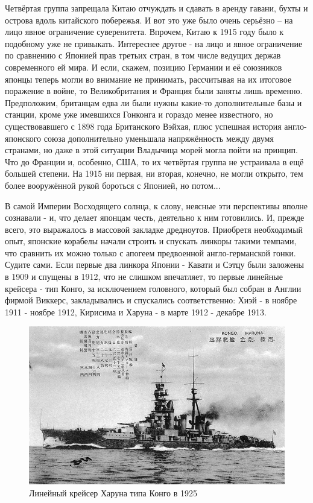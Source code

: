 Четвёртая группа запрещала Китаю отчуждать и сдавать в аренду гавани, бухты и острова вдоль китайского побережья. И вот это уже было очень серьёзно – на лицо явное ограничение суверенитета. Впрочем, Китаю к 1915 году было к подобному уже не привыкать. Интереснее другое - на лицо и явное ограничение по сравнению с Японией прав третьих стран, в том числе ведущих держав современного ей мира. И если, скажем, позицию Германии и её союзников японцы теперь могли во внимание не принимать, рассчитывая на их итоговое поражение в войне, то Великобритания и Франция были заняты лишь временно. Предположим, британцам едва ли были нужны какие-то дополнительные базы и станции, кроме уже имевшихся Гонконга и гораздо менее известного, но существовавшего с 1898 года Британского Вэйхая, плюс успешная история англо-японского союза дополнительно уменьшала напряжённость между двумя странами, но даже в этой ситуации Владычица морей могла пойти на принцип. Что до Франции и, особенно, США, то их четвёртая группа не устраивала в ещё большей степени. На 1915 ни первая, ни вторая, конечно, не могли открыто, тем более вооружённой рукой бороться с Японией, но потом...

В самой Империи Восходящего солнца, к слову, неясные эти перспективы вполне сознавали - и, что делает японцам честь, деятельно к ним готовились. И, прежде всего, это выражалось в массовой закладке дредноутов. Приобретя необходимый опыт, японские корабелы начали строить и спускать линкоры такими темпами, что сравнить их можно только с апогеем предвоенной англо-германской гонки. Судите сами. Если первые два линкора Японии - Кавати и Сэтцу были заложены в 1909 и спущены в 1912, что не слишком впечатляет, то первые линейные крейсера - тип Конго, за исключением головного, который был собран в Англии фирмой Виккерс, закладывались и спускались соответственно: Хиэй - в ноябре 1911 - ноябре 1912, Кирисима и Харуна - в марте 1912 - декабре 1913. 

\begin{figure}[h!tb] 
	\centering\includegraphics[scale=0.4]{Glava4/x3e2uh2m9tE.jpg}
	\caption{Линейный крейсер Харуна типа Конго в 1925}%
\end{figure}

